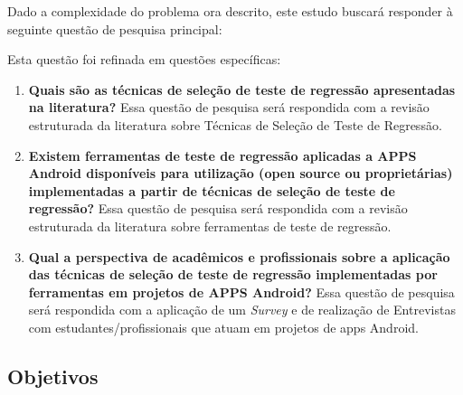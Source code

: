 Dado a complexidade do problema ora descrito, este estudo buscará responder à seguinte questão de pesquisa principal:
\leavevspace 

\begin{center}
    \noindent{}
\end{center}

\vspace{.5em}

Esta questão foi refinada em questões específicas:
\vspace{.5em}

\begin{enumerate}[label=\bf QP\arabic*,leftmargin=1.8cm]
    
    \item \textbf{Quais são as técnicas de seleção de teste de regressão apresentadas na literatura?} Essa questão de pesquisa será respondida com a revisão estruturada da literatura sobre Técnicas de Seleção de Teste de Regressão.
    
    \item \textbf{Existem ferramentas de teste de regressão aplicadas a \ac{APPS} Android disponíveis para utilização (open source ou proprietárias) implementadas a partir de técnicas de seleção de teste de regressão?} Essa questão de pesquisa será respondida com a revisão estruturada da literatura sobre ferramentas de teste de regressão.
    
    \item \textbf{Qual a perspectiva de acadêmicos e profissionais sobre a aplicação das técnicas de seleção de teste de regressão implementadas por ferramentas em projetos de \ac{APPS} Android?} Essa questão de pesquisa será respondida com a aplicação de um \textit{Survey} e de realização de Entrevistas com estudantes/profissionais que atuam em projetos de apps Android.

\end{enumerate}



\subsection{Objetivos}

